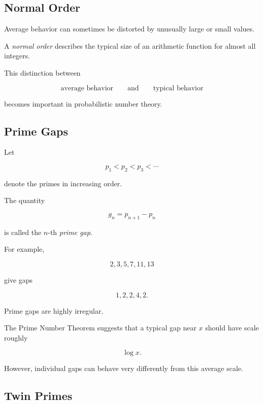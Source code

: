 \subsection{Normal Order}
\label{subsec:normal-order}

Average behavior can sometimes be distorted by unusually large or small
values.

A \emph{normal order} describes the typical size of an arithmetic function
for almost all integers.

This distinction between

\[
\text{average behavior}
\qquad\text{and}\qquad
\text{typical behavior}
\]

becomes important in probabilistic number theory.

\subsection{Prime Gaps}
\label{subsec:prime-gaps}

Let

\[ p_1<p_2<p_3<\cdots \]

denote the primes in increasing order.

The quantity

\[ g_n=p_{n+1}-p_n \]

is called the \(n\)-th \emph{prime gap}.

For example,

\[ 2,3,5,7,11,13 \]

give gaps

\[ 1,2,2,4,2. \]

Prime gaps are highly irregular.

The Prime Number Theorem suggests that a typical gap near \(x\) should have
scale roughly

\[ \log x. \]

However, individual gaps can behave very differently from this average
scale.

\subsection{Twin Primes}
\label{subsec:twin-primes}

